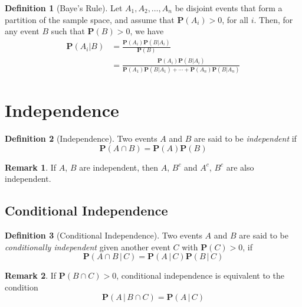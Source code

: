 \documentclass{tufte-handout}
\theoremstyle{definition} \newtheorem{definition}{Definition}
\theoremstyle{definition} \newtheorem{remark}{Remark}
\newcommand{\prob}[1]{\mathbf{P}\left(#1\right)}
\newcommand{\cprob}[2]{\mathbf{P}\left(#1 \,|\, #2\right)}
\begin{document}
\begin{definition}[Baye's Rule]
  Let $A_1, A_2, \ldots, A_n$ be disjoint events that form a partition of
  the sample space, and assume that $\prob{A_i} > 0$, for all $i$. Then,
  for any event $B$ such that $\prob{B} > 0$, we have
  \begin{align*}
    \prob{A_i | B} & = \frac{\prob{A_i} \prob{B | A_i}}{\prob{B}} \\
                   & = \frac{\prob{A_i} \prob{B | A_i}}
                     {\prob{A_1} \prob{B | A_1} + \cdots + \prob{A_n}
                     \prob{B | A_n}}
  \end{align*}
\end{definition}

\section{Independence}
\begin{definition}[Independence]
  Two events $A$ and $B$ are said to be \emph{independent} if
  \begin{equation*}
    \prob{A \cap B} = \prob{A} \prob{B}
  \end{equation*}
\end{definition}

\begin{remark}
  If $A$, $B$ are independent, then $A$, $B^c$ and $A^c$, $B^c$ are
  also independent.
\end{remark}

\subsection{Conditional Independence}
\begin{definition}[Conditional Independence]
  Two events $A$ and $B$ are said to be \emph{conditionally independent}
  given another event $C$ with $\prob{C} > 0$, if
  \begin{equation*}
    \cprob{A \cap B}{C} = \cprob{A}{C} \cprob{B}{C}
  \end{equation*}
\end{definition}

\begin{remark}
  If $\prob{B \cap C} > 0$, conditional independence is equivalent to the
  condition
  \begin{equation*}
    \cprob{A}{B \cap C} = \cprob{A}{C}
  \end{equation*}
\end{remark}
\end{document}
